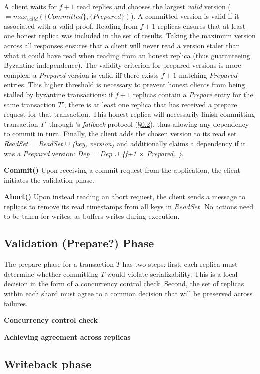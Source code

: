 \\
A client waits for $f+1$ read replies and chooses the largest \textit{valid} version ($=max_{valid}(\{Committed\},\{Prepared\})$).
A committed version is valid if it associated with a valid proof. 
Reading from $f+1$ replicas ensures that at least one honest replica
was included in the set of results. Taking the maximum version across all responses ensures that a client will never read a version staler than what it could have read when reading from an honest replica (thus guaranteeing Byzantine independence). The validity criterion for prepared versions is more complex: a \textit{Prepared}
version is valid iff there exists $f+1$ matching $Prepared$ entries.
 This higher threshold is necessary to prevent honest clients from being stalled by byzantine transactions: if $f+1$ replicas contain a \textit{Prepare} entry for the same transaction $T'$, there is at least one replica that has received a prepare request for that transaction. This honest replica will necessarily finish committing transaction $T'$ through \sys's \textit{fallback} protocol (\S\ref{}), thus allowing any dependency to commit in turn.
Finally, the client adds the chosen version to its read set \textit{ReadSet = ReadSet $\cup$ (key, version)} and additionally claims a dependency if it was a \textit{Prepared} version: \textit{Dep = Dep $\cup$ \{f+1 $\times$ Prepared$_r$ \}}. 

\par \textbf{Commit()} Upon receiving a commit request from the application, the client initiates the validation phase.

\par \textbf{Abort()} Upon instead reading an abort request,
the client sends a message to replicas to remove its read timestamps from all keys in $ReadSet$. No actions need to be taken for writes, as \sys buffers writes during execution.

\subsection{Validation (Prepare?) Phase}
The prepare phase for a transaction $T$ has two-steps: first,
each replica must determine whether committing $T$ would violate serializability. This is a local decision in the form of a concurrency control check. Second, the set of replicas within
each shard must agree to a common decision that will be preserved across failures. 

\par \textbf{Concurrency control check}

\par \textbf{Achieving agreement across replicas}

\subsection{Writeback phase}

